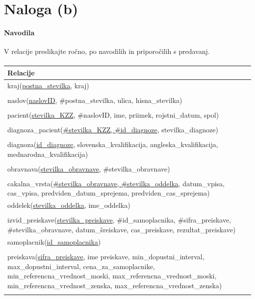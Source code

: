 \documentclass[a4paper,12pt]{report}
\begin{document}
\section*{Naloga (b)}
\paragraph{Navodila}
\begin{em}
  V relacije preslikajte ročno, po navodilih in priporočilih s predavanj.
\end{em}

\paragraph{}
  \begin{center}
    \begin{tabular}{ ||p{15cm}|| }
      \hline
      Relacije \\
      \hline \hline
      kraj(\underline{postna\_stevilka}, kraj)\\ \\
      naslov(\underline{naslovID}, \#postna\_stevilka, ulica, hisna\_stevilka)\\ \\
      pacient(\underline{stevilka\_KZZ}, \#naslovID, ime, priimek, rojstni\_datum, spol)\\ \\
      diagnoza\_pacient(\underline{\#stevilka\_KZZ, \#id\_diagnoze}, stevilka\_diagnoze)\\ \\
      diagnoza(\underline{id\_diagnoze}, slovenska\_kvalifikacija, angleska\_kvalifikacija, mednarodna\_kvalifikacija)\\ \\
      obravnava(\underline{stevilka\_obravnave}, \#stevilka\_obravnave)\\ \\
      cakalna\_vrsta(\underline{\#stevilka\_obravnave, \#stevilka\_oddelka}, datum\_vpisa, cas\_vpisa, predviden\_datum\_sprejema, predviden\_cas\_sprejema)\\
      oddelek(\underline{stevilka\_oddelka}, ime\_oddelka)\\ \\
      izvid\_preiskave(\underline{stevilka\_preiskave}, \#id\_samoplacnika, \#sifra\_preiskave, \#stevilka\_obravnave, datum\_šreiskave, cas\_preiskave, rezultat\_preiskave)\\
      samoplacnik(\underline{id\_samoplacnika})\\ \\
      preiskava(\underline{sifra\_preiskave}, ime preiskave, min\_dopustni\_interval, max\_dopustni\_interval, cena\_za\_samoplacnike, min\_referencna\_vrednost\_moski, max\_referencna\_vrednost\_moski, min\_referencna\_vrednost\_zenska, max\_referencna\_vrednost\_zenska)\\ \\
      \hline
  \end{tabular}
\end{center}
\end{document}
